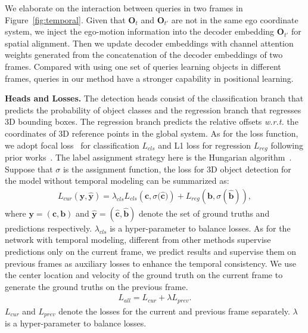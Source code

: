 \documentclass[10pt,twocolumn,letterpaper]{article}
\begin{document}
We elaborate on the interaction between queries in two frames in Figure~\ref{fig:temporal}. Given that $\mathbf{O}_{t}$ and $\mathbf{O}_{t'}$ are not in the same ego coordinate system, we inject the ego-motion information into the decoder embedding $\mathbf{O}_{t'}$ for spatial alignment. Then we update decoder embeddings with channel attention weights generated from the concatenation of the decoder embeddings of two frames. Compared with using one set of queries learning objects in different frames, queries in our method have a stronger capability in positional learning.

\noindent\textbf{Heads and Losses.} The detection heads consist of the classification branch that predicts the probability of object classes and the regression branch that regresses 3D bounding boxes. The regression branch predicts the relative offsets \textit{w.r.t.} the coordinates of 3D reference points in the global system. As for the loss function, we adopt focal loss~\cite{lin2017focal} for classification $L_{cls}$ and L1 loss for regression $L_{reg}$ following prior works~\cite{wang2022detr3d,liu2022petr}. The label assignment strategy here is the Hungarian algorithm~\cite{kuhn1955hungarian}. Suppose that $\sigma$ is the assignment function, the loss for 3D object detection for the model without temporal modeling can be summarized as:
\begin{equation}
\begin{gathered}
L_{cur}(\mathbf{y}, \mathbf{\hat{y}}) = \lambda_{cls} L_{cls}(\mathbf{c}, \sigma{(\mathbf{\hat{c})}}) + L_{reg}(\mathbf{b}, \sigma{(\mathbf{\hat{b}})}),
\end{gathered}
\end{equation}
where $\mathbf{y}=(\mathbf{c}, \mathbf{b})$ and $\hat{\mathbf{y}}=(\mathbf{\hat{c}}, \mathbf{\hat{b}})$ denote the set of ground truths and predictions respectively. $\lambda_{cls}$ is a hyper-parameter to balance losses.
As for the network with temporal modeling, different from other methods supervise predictions only on the current frame, we predict results and supervise them on previous frames as auxiliary losses to enhance the temporal consistency. We use the center location and velocity of the ground truth on the current frame to generate the ground truths on the previous frame.
\begin{equation}
\begin{gathered}
L_{all} = L_{cur} + \lambda L_{prev}.
\end{gathered}
\end{equation}
$L_{cur}$ and $L_{prev}$ denote the losses for the current and previous frame separately. $\lambda$ is a hyper-parameter to balance losses.
\end{document}
